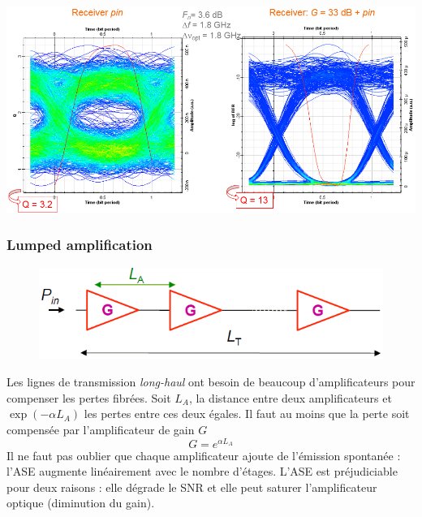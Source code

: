 \begin{center}
	\includegraphics[scale=0.4]{ch6/image14}
\end{center}


\subsubsection{Lumped amplification}
	\begin{figure}
	\includegraphics[scale=0.4]{ch6/image15}
	\end{figure}
Les lignes de transmission \textit{long-haul} ont besoin de beaucoup d'amplificateurs pour compenser les
pertes fibrées. Soit $L_A$, la distance entre deux amplificateurs et $\exp(-\alpha L_A)$ les pertes entre
ces deux égales. Il faut au moins que la perte soit compensée par l'amplificateur de gain $G$
\begin{equation}
G = {e^{\alpha {L_A}}}
\end{equation}
Il ne faut pas oublier que chaque amplificateur ajoute de l'émission spontanée : l'ASE
augmente linéairement avec le nombre d'étages. L'ASE est préjudiciable pour deux raisons : elle dégrade 
le SNR et elle peut saturer l'amplificateur optique (diminution du gain).\\

